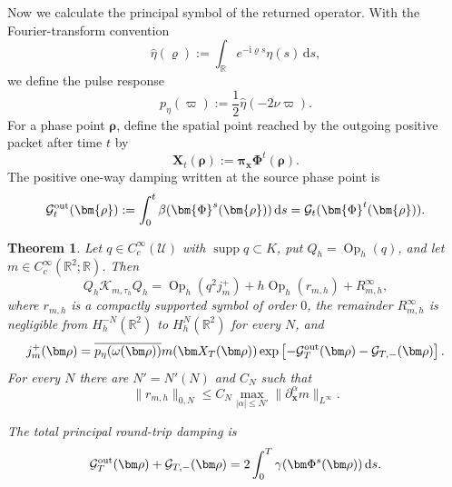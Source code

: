 \documentclass[11pt,reqno]{amsart}
\newtheorem{theorem}{Theorem}[section]
\newcommand{\ii}{\mathrm{i}}
\newcommand{\dd}{\,\mathrm{d}}
\newcommand{\Op}{\operatorname{Op}}
\newcommand{\supp}{\operatorname{supp}}
\numberwithin{equation}{section}
\begin{document}
Now we calculate the principal symbol of the returned operator. With the Fourier-transform convention
$$
    \widehat\eta(\varrho):=\int_{\mathbb R}e^{-\ii\varrho s}\eta(s)\dd s,
$$
we define the pulse response
\begin{equation}\label{eq:pulse-response}
p_\eta(\varpi):=\frac12\widehat\eta(-2\nu\varpi).
\end{equation}
For a phase point $\bm\rho$, define the spatial point reached by the outgoing positive packet after time $t$ by
\begin{equation*}
 \bm{X}_t(\bm{\rho}):=\bm{\pi}_{\bm{x}}\bm{\Phi}^t(\bm{\rho}).
\end{equation*}
The positive one-way damping written at the source phase point is
\begin{equation*}
 \mathcal G_t^{\rm out}(\bm{\rho}):=\int_0^t\beta(\bm{\Phi}^s(\bm{\rho}))\dd s =\mathcal G_t(\bm{\Phi}^t(\bm{\rho})).
\end{equation*}
\begin{theorem}\label{thm:symbol-tailored}
Let $q\in C_c^\infty(\mathcal U)$ with $\supp q\subset K$, put $Q_h=\Op_h(q)$, and let $m\in C_c^\infty(\mathbb R^2;\mathbb R)$. Then
\begin{equation}\label{eq:returned-symbol-expansion}
 Q_h\mathcal K_{m,\tau_h}Q_h
 =\Op_h(q^2j_m^+)+h\Op_h(r_{m,h})+R_{m,h}^{\infty},
\end{equation}
where $r_{m,h}$ is a compactly supported symbol of order $0$, the remainder $R_{m,h}^{\infty}$ is negligible from $H_h^{-N}(\mathbb R^2)$ to $H_h^N(\mathbb R^2)$ for every $N$, and
\begin{equation}\label{eq:returned-principal-symbol}
 j_m^+(\bm\rho)=\overline{p_\eta(\omega(\bm\rho))}m(\bm X_T(\bm\rho))\exp\left[-\mathcal G_T^{\rm out}(\bm\rho)-\mathcal G_{T,-}(\bm\rho)\right].
\end{equation}
For every $N$ there are $N'=N'(N)$ and $C_N$ such that
\begin{equation}\label{eq:returned-symbol-seminorm-bound}
 \|r_{m,h}\|_{0,N}\le C_N\max_{|\alpha|\le N'}\|\partial_{\bm x}^\alpha m\|_{L^\infty}.
\end{equation}

The total principal round-trip damping is
\begin{equation}\label{eq:round-trip-damping}
 \mathcal G_T^{\rm out}(\bm\rho)+\mathcal G_{T,-}(\bm\rho)=2\int_0^T\gamma(\bm\Phi^s(\bm\rho))\dd s.
\end{equation}
\end{theorem}
\end{document}
